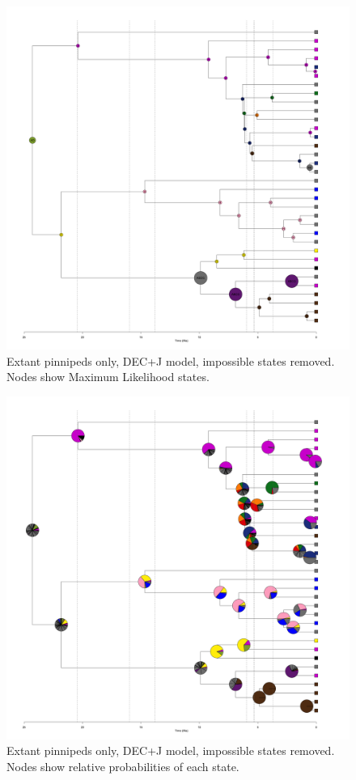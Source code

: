\documentclass[a4paper, 12pt]{article}
\begin{document}
\begin{figure}[H]
 \centering
  \includegraphics[width = \linewidth]{figures/extant-pinnipeds-DECj-impossible-MLstates.png}
  \caption{Extant pinnipeds only, DEC+J model, impossible states removed. Nodes show Maximum Likelihood states.}
  \label{fig-extant-decj-ml}
\end{figure} 

\begin{figure}[H]
\centering
  \includegraphics[width = \linewidth]{figures/extant-pinnipeds-DECj-impossible-pies.png}
  \caption{Extant pinnipeds only, DEC+J model, impossible states removed. Nodes show relative probabilities of each state.}
  \label{fig-extant-decj-pie}
\end{figure} 
 
\end{document}
